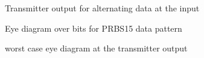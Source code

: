 \begin{figure}[H]
  \centering
  \caption{Transmitter output for alternating data at the input}
  \label{fig:alternating_data}
\end{figure}

\begin{figure}[H]
  \centering
  \caption{Eye diagram over \unit[10000]{bits} for PRBS15 data pattern}
  \label{fig:eye_prbs15}
\end{figure}

\begin{figure}[H]
  \centering
  \caption{worst case eye diagram at the transmitter output}
  \label{fig:wc_eye}
\end{figure}

